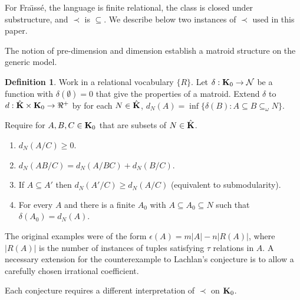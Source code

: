 \documentclass[11pt]{amsart}
\def\NN{\mathcal{N}}
\def\bK{{\bf K}}
\theoremstyle{definition}
\newtheorem{definition}[theorem]{Definition}
\theoremstyle{remark}
\numberwithin{equation}{section}
\begin{document}
For Fra{\" \i}ss\'{e}, the language is finite relational, the class is closed
under substructure, and $\prec$ is $\subseteq$. We describe below two
instances of $\prec$ used in this paper.

\medspace

The notion of pre-dimension and dimension establish a matroid structure on
the generic model.
\begin{definition}\label{predim} Work in a relational vocabulary $\{R\}$.
Let $\delta: {\bf K}_0 \rightarrow \NN$ be a function with $\delta(\emptyset)
= 0$ that give the properties of a matroid. Extend $\delta$ to $d: {\hat \bK}
\times {\bK}_0
 \rightarrow \Re^+$ by for each $N \in {\hat \bK}$,
$d_N(A)= \inf \{\delta(B): A \subseteq B \subseteq_{\omega} N\}$.

Require for  $A,B,C \in \bK_0$  that are  subsets of $N\in \hat \bK$.
\begin{enumerate}
\item $d_N(A/C) \geq 0$.
\item $d_N(AB/C) = d_N(A/BC) + d_N(B/C)$.
\item If $A \subseteq A'$ then $d_N(A'/C) \geq d_N(A/C)$ (equivalent to
    submodularity).
\item For every $A$ and there is a finite $A_0$ with $A\subseteq
    A_0\subseteq  N$ such that $\delta(A_0) = d_N(A)$.
\end{enumerate}
\end{definition}



The original examples were of the form $\epsilon(A) = m |A| - n |R(A)|$,
where $|R(A)|$ is the number of instances of tuples satisfying $\tau$
relations in $A$.  A necessary extension for the counterexample to Lachlan's
conjecture is to allow a
carefully chosen irrational coefficient. %



\medspace


   Each conjecture requires a different interpretation of $\prec$ on
$\bK_0$.
\end{document}
